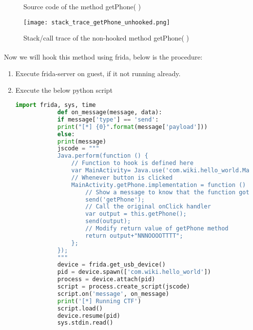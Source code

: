 \documentclass[../main.tex]{subfile}
\begin{document}
	\begin{figure}[H]
		\caption{Source code of the method getPhone( )}
		\label{fig:getPhone_source}
	\end{figure}
	
	\begin{figure}[H]
		\centering
		\texttt{[image: stack\_trace\_getPhone\_unhooked.png]}
		\caption{Stack/call trace of the non-hooked method getPhone( )}
		\label{fig:getPhone_trace}
	\end{figure}
	
	
	\paragraph{} Now we will hook this method using frida, below is the procedure:
	\begin{enumerate}
		\item Execute frida-server on guest, if it not running already.
		\item Execute the below python script
		\begin{lstlisting}[language=python]
			import frida, sys, time
			def on_message(message, data):
			if message['type'] == 'send':
			print("[*] {0}".format(message['payload']))
			else:
			print(message)
			jscode = """
			Java.perform(function () {
				// Function to hook is defined here
				var MainActivity= Java.use('com.wiki.hello_world.MainActivity');
				// Whenever button is clicked
				MainActivity.getPhone.implementation = function () {
					// Show a message to know that the function got called
					send('getPhone');
					// Call the original onClick handler
					var output = this.getPhone();
					send(output);
					// Modify return value of getPhone method
					return output+"NNNOOOOTTTT";
				};
			});
			"""
			device = frida.get_usb_device()
			pid = device.spawn(['com.wiki.hello_world'])
			process = device.attach(pid)
			script = process.create_script(jscode)
			script.on('message', on_message)
			print('[*] Running CTF')
			script.load()
			device.resume(pid)
			sys.stdin.read()
		\end{lstlisting}
	\end{enumerate}
\end{document}
